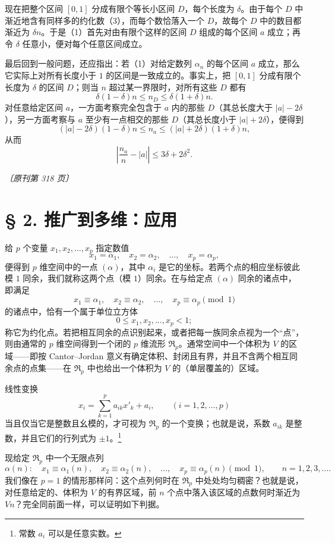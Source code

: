 \documentclass[UTF8,11pt,a4paper,fontset=none]{ctexart}
\theoremstyle{weylthm}
\newcommand{\origpage}[1]{%
  \par\vspace{0.7em}\noindent\hfill{\small\itshape〔原刊第 #1 页〕}\par\vspace{0.25em}}
\begin{document}
现在把整个区间 \([0,1]\) 分成有限个等长小区间 \(D\)，每个长度为 \(\delta\)。由于每个 \(D\) 中渐近地含有同样多的约化数（3），而每个数恰落入一个 \(D\)，故每个 \(D\) 中的数目都渐近为 \(\delta n\)。于是（1）首先对由有限个这样的区间 \(D\) 组成的每个区间 \(a\) 成立；再令 \(\delta\) 任意小，便对每个任意区间成立。

最后回到一般问题，还应指出：若（1）对给定数列 \(\alpha_n\) 的每个区间 \(a\) 成立，那么它实际上对所有长度小于 \(1\) 的区间是一致成立的。事实上，把 \([0,1]\) 分成有限个长度为 \(\delta\) 的区间 \(D\)；则当 \(n\) 超过某一界限时，对所有这些 \(D\) 都有
\[
  \delta(1-\delta)n\leq n_D\leq\delta(1+\delta)n.
\]
对任意给定区间 \(a\)，一方面考察完全包含于 \(a\) 内的那些 \(D\)（其总长度大于 \(|a|-2\delta\)），另一方面考察与 \(a\) 至少有一点相交的那些 \(D\)（其总长度小于 \(|a|+2\delta\)），便得到
\[
  (|a|-2\delta)(1-\delta)n
  \leq n_a\leq
  (|a|+2\delta)(1+\delta)n,
\]
从而
\[
  \left|\frac{n_a}{n}-|a|\right|
  \leq3\delta+2\delta^2.
\]

\origpage{318}

\section*{§ 2. 推广到多维：应用}

给 \(p\) 个变量 \(x_1,x_2,\ldots,x_p\) 指定数值
\[
  x_1=\alpha_1,\quad x_2=\alpha_2,\quad\ldots,\quad x_p=\alpha_p,
\]
便得到 \(p\) 维空间中的一点 \((\alpha)\)，其中 \(\alpha_i\) 是它的坐标。若两个点的相应坐标彼此模 \(1\) 同余，我们就称这两个点（模 \(1\)）同余。在与给定点 \((\alpha)\) 同余的诸点中，即满足
\[
  x_1\equiv\alpha_1,\quad x_2\equiv\alpha_2,\quad\ldots,\quad
  x_p\equiv\alpha_p\pmod1
\]
的诸点中，恰有一个属于单位立方体
\[
  0\leq x_1,x_2,\ldots,x_p<1;
\]
称它为约化点。若把相互同余的点识别起来，或者把每一族同余点视为一个“点”，则由通常的 \(p\) 维空间得到一个闭的 \(p\) 维流形 \(\mathfrak R_p\)。通常空间中一个体积为 \(V\) 的区域——即按 Cantor--Jordan 意义有确定体积、封闭且有界，并且不含两个相互同余点的点集——在 \(\mathfrak R_p\) 中也给出一个体积为 \(V\) 的（单层覆盖的）区域。

线性变换
\[
  x_i=\sum_{k=1}^{p}a_{ik}x'_k+a_i,
  \qquad (i=1,2,\ldots,p)
\]
当且仅当它是整数且幺模的，才可视为 \(\mathfrak R_p\) 的一个变换；也就是说，系数 \(a_{ik}\) 是整数，并且它们的行列式为 \(\pm1\)。\footnote{常数 \(a_i\) 可以是任意实数。}

现给定 \(\mathfrak R_p\) 中一个无限点列
\[
  \alpha(n):\quad
  x_1\equiv\alpha_1(n),\quad x_2\equiv\alpha_2(n),\quad\ldots,\quad
  x_p\equiv\alpha_p(n)\pmod1,
  \qquad n=1,2,3,\ldots.
\]
我们像在 \(p=1\) 的情形那样问：这个点列何时在 \(\mathfrak R_p\) 中处处均匀稠密？也就是说，对任意给定的、体积为 \(V\) 的有界区域，前 \(n\) 个点中落入该区域的点数何时渐近为 \(Vn\)？完全同前面一样，可以证明如下判据。
\end{document}
